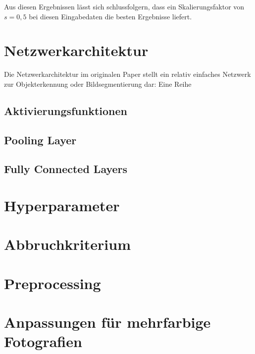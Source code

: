 Aus diesen Ergebnissen lässt sich schlussfolgern, dass ein Skalierungsfaktor von $s=0,5$ bei diesen Eingabedaten die besten Ergebnisse liefert.

\section{Netzwerkarchitektur}
\label{sec:networkarch}

Die Netzwerkarchitektur im originalen Paper stellt ein relativ einfaches Netzwerk zur Objekterkennung oder Bildsegmentierung dar: Eine Reihe

\subsection{Aktivierungsfunktionen}
\label{ssec:arch_activation}

\subsection{Pooling Layer}
\label{ssec:arch_pooling}

\subsection{Fully Connected Layers}
\label{ssec:arch_fully}

\section{Hyperparameter}
\label{sec:hyperparameter}

\section{Abbruchkriterium}
\label{sec:stoppingcriteria}

\section{Preprocessing}
\label{sec:preprocessing}

\section{Anpassungen für mehrfarbige Fotografien}
\label{sec:referenceimages}